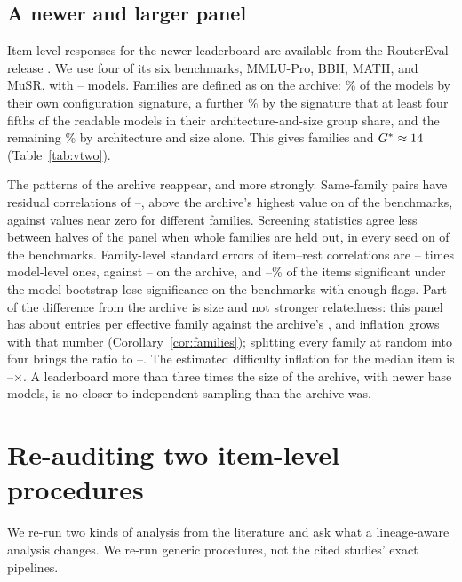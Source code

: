 \documentclass[10pt]{article}
\theoremstyle{remark}\newtheorem{remark}{Remark}
\begin{document}
\subsection{A newer and larger panel}\label{sec:newer}
Item-level responses for the newer leaderboard are available from the
RouterEval release \citep{huang2025routereval}. We use four of its six
benchmarks, MMLU-Pro, BBH, MATH, and MuSR, with \VrModelsMin--\VrModelsMax{}
models. Families are defined as on the archive: \VfDirect\% of the models by
their own configuration signature, a further \VfImputed\% by the signature
that at least four fifths of the readable models in their
architecture-and-size group share, and the remaining \VfCoarse\% by
architecture and size alone. This gives \VfFamilies{} families and
$G^\ast\approx14$ (Table~\ref{tab:vtwo}).

The patterns of the archive reappear, and more strongly. Same-family pairs
have residual correlations of \VrSameMin--\VrSameMax, above the archive's
highest value on \VrSameAbove{} of the \VrTasks{} benchmarks, against values
near zero for different families. Screening statistics agree less between
halves of the panel when whole families are held out, in every seed on
\VrTransferPos{} of the \VrTasks{} benchmarks. Family-level standard errors of
item--rest correlations are \VrSEMin--\VrSEMax{} times model-level ones,
against \ScreenSEMin--\ScreenSEMax{} on the archive, and
\VrLostMin--\VrLostMax\% of the items significant under the model bootstrap
lose significance on the \VrLostTasks{} benchmarks with enough flags. Part of
the difference from the archive is size and not stronger relatedness: this
panel has about \VfPerFamily{} entries per effective family against the
archive's \ArchPerFamily, and inflation grows with that number
(Corollary~\ref{cor:families}); splitting every family at random into four
brings the ratio to \VrSESplitMin--\VrSESplitMax. The estimated difficulty
inflation for the median item is \VrInflMin--\VrInflMax$\times$. A
leaderboard more than three times the size of the archive, with newer base
models, is no closer to independent sampling than the archive was.

\section{Re-auditing two item-level procedures}\label{sec:screens}
We re-run two kinds of analysis from the literature and ask what a
lineage-aware analysis changes. We re-run generic procedures, not the cited
studies' exact pipelines.
\end{document}
